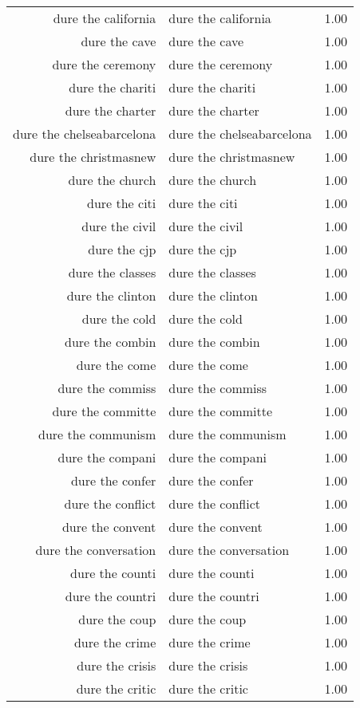 \begin{table}[ht]
\begin{tabular}{rlr}
  dure the california & dure the california & 1.00 \\ 
  dure the cave & dure the cave & 1.00 \\ 
  dure the ceremony & dure the ceremony & 1.00 \\ 
  dure the chariti & dure the chariti & 1.00 \\ 
  dure the charter & dure the charter & 1.00 \\ 
  dure the chelseabarcelona & dure the chelseabarcelona & 1.00 \\ 
  dure the christmasnew & dure the christmasnew & 1.00 \\ 
  dure the church & dure the church & 1.00 \\ 
  dure the citi & dure the citi & 1.00 \\ 
  dure the civil & dure the civil & 1.00 \\ 
  dure the cjp & dure the cjp & 1.00 \\ 
  dure the classes & dure the classes & 1.00 \\ 
  dure the clinton & dure the clinton & 1.00 \\ 
  dure the cold & dure the cold & 1.00 \\ 
  dure the combin & dure the combin & 1.00 \\ 
  dure the come & dure the come & 1.00 \\ 
  dure the commiss & dure the commiss & 1.00 \\ 
  dure the committe & dure the committe & 1.00 \\ 
  dure the communism & dure the communism & 1.00 \\ 
  dure the compani & dure the compani & 1.00 \\ 
  dure the confer & dure the confer & 1.00 \\ 
  dure the conflict & dure the conflict & 1.00 \\ 
  dure the convent & dure the convent & 1.00 \\ 
  dure the conversation & dure the conversation & 1.00 \\ 
  dure the counti & dure the counti & 1.00 \\ 
  dure the countri & dure the countri & 1.00 \\ 
  dure the coup & dure the coup & 1.00 \\ 
  dure the crime & dure the crime & 1.00 \\ 
  dure the crisis & dure the crisis & 1.00 \\ 
  dure the critic & dure the critic & 1.00 \\ 

\end{tabular}
\end{table}
